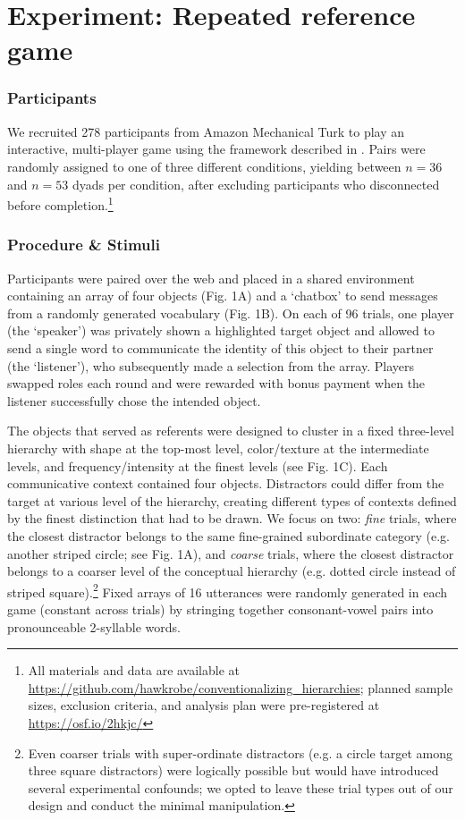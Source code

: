 \documentclass[10pt,letterpaper]{article}
\begin{document}
\section{Experiment: Repeated reference game}

\subsubsection{Participants}

We recruited 278 participants from Amazon Mechanical Turk to play an interactive, multi-player game using the framework described in . Pairs were randomly assigned to one of three different conditions, yielding between $n=36$ and $n=53$ dyads per condition, after excluding participants who disconnected before completion.\footnote{All materials and data are available at \url{https://github.com/hawkrobe/conventionalizing_hierarchies}; planned sample sizes, exclusion criteria, and analysis plan were pre-registered at \url{https://osf.io/2hkjc/}}

\subsubsection{Procedure \& Stimuli}
Participants were paired over the web and placed in a shared environment containing an array of four objects (Fig. 1A) and a `chatbox' to send messages from a randomly generated vocabulary (Fig. 1B). On each of 96 trials, one player (the `speaker') was privately shown a highlighted target object and allowed to send a single word to communicate the identity of this object to their partner (the `listener'), who subsequently made a selection from the array. Players swapped roles each round and were rewarded with bonus payment when the listener successfully chose the intended object.

The objects that served as referents were designed to cluster in a fixed three-level hierarchy with shape at the top-most level, color/texture at the intermediate levels, and frequency/intensity at the finest levels (see Fig. 1C). Each communicative context contained four objects. Distractors could differ from the target at various level of the hierarchy, creating different types of contexts defined by the finest distinction that had to be drawn. We focus on two: \emph{fine} trials, where the closest distractor belongs to the same fine-grained subordinate category (e.g. another striped circle; see Fig. 1A), and \emph{coarse} trials, where the closest distractor belongs to a coarser level of the conceptual hierarchy (e.g. dotted circle instead of striped square).\footnote{Even coarser trials with super-ordinate distractors (e.g. a circle target among three square distractors) were logically possible but would have introduced several experimental confounds; we opted to leave these trial types out of our design and conduct the minimal manipulation.} Fixed arrays of 16 utterances were randomly generated in each game (constant across trials) by stringing together consonant-vowel pairs into pronounceable 2-syllable words.
\end{document}
